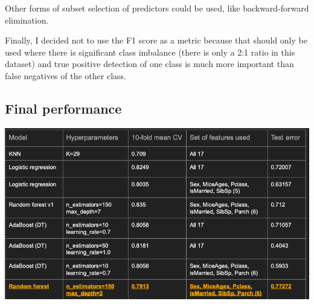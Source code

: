 \documentclass[12pt]{article}
\begin{document}
Other forms of subset selection of predictors could be used, like backward-forward elimination.\newline

Finally, I decided not to use the F1 score as a metric because that should only be used where there is significant class imbalance (there is only a 2:1 ratio in this dataset) and true positive detection of one class is much more important than false negatives of the other class.\newline

\subsection{Final performance}

\includegraphics[scale=0.4]{final_performance}
\end{document}
